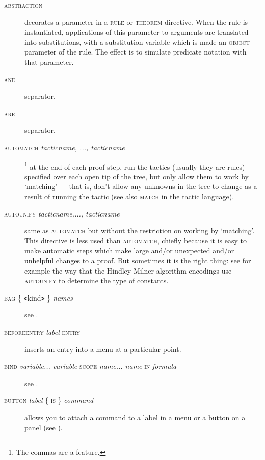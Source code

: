 \begin{description}
\item[\textsc{abstraction}] decorates a parameter in a \textsc{rule} or \textsc{theorem} directive. When the rule is instantiated, applications of this parameter to arguments are translated into substitutions, with a substitution variable which is made an \textsc{object} parameter of the rule. The effect is to simulate predicate notation with that parameter.

\item[\textsc{and}] separator.

\item[\textsc{are}] separator.

\item[\textsc{automatch} \textit{tacticname, ..., tacticname}]\footnote{The commas are a feature.} at the end of each proof step, run the tactics (usually they are rules) specified over each open tip of the tree, but only allow them to work by `matching' --- that is, don't allow any unknowns in the tree to change as a result of running the tactic (see also \textsc{match} in the tactic language).

\item[\textsc{autounify} \textit{tacticname,..., tacticname}] same as \textsc{automatch} but without the restriction on working by `matching'. This directive is less used than \textsc{automatch}, chiefly because it is easy to make automatic steps which make large and/or unexpected and/or unhelpful changes to a proof. But sometimes it is the right thing: see for example the way that the Hindley-Milner algorithm encodings use \textsc{autounify} to determine the type of constants.

\item[\textsc{bag \{} \texttt{<}kind\texttt{>} \textsc{\}} \textit{names}] see .

\item[\textsc{beforeentry} \textit{label} \textsc{entry}] inserts an entry into a menu at a particular point.

\item[\textsc{bind} \textit{variable... variable} \textsc{scope} \textit{name... name} \textsc{in} \textit{formula}] see .

\item[\textsc{button} \textit{label} \{ \textsc{is} \} \textit{command}] allows you to attach a command to a label in a menu or a button on a panel (see ).


\end{description}
